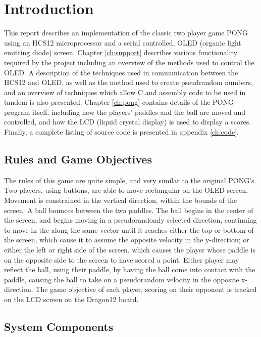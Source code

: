 \chapter{Introduction}

This report describes an implementation of the classic two player game PONG using an HCS12 microprocessor and a serial controlled, OLED (organic light emitting diode) screen.
Chapter \ref{ch:support} describes various functionality required by the project including an overview of the methods used to control the OLED.
A description of the techniques used in communication between the HCS12 and OLED, as well as the method used to create pseudrandom numbers, and an overview of techniques which allow C and assembly code to be used in tandem is also presented.
Chapter \ref{ch:pong} contains details of the PONG program itself, including how the players' paddles and the ball are moved and controlled, and how the LCD (liquid crystal display) is used to display a scores.
Finally, a complete listing of source code is presented in appendix \ref{ch:code}.

\section{Rules and Game Objectives}

The rules of this game are quite simple, and very similar to the original PONG's.
Two players, using buttons, are able to move rectangular  on the OLED screen.
Movement is constrained in the vertical direction, within the bounds of the screen.
A ball bounces between the two paddles.
The ball begins in the center of the screen, and begins moving in a pseudorandomly selected direction, continuing to move in the along the same vector until it reaches either the top or bottom of the screen, which cause it to assume the opposite velocity in the y-direction; or either the left or right side of the screen, which causes the player whose paddle is on the opposite side to the screen to have scored a point.
Either player may reflect the ball, using their paddle, by having the ball come into contact with the paddle, causing the ball to take on a pseudorandom velocity in the opposite x-direction.
The game objective of each player, scoring on their opponent is tracked on the LCD screen on the Dragon12 board.

\section{System Components}

